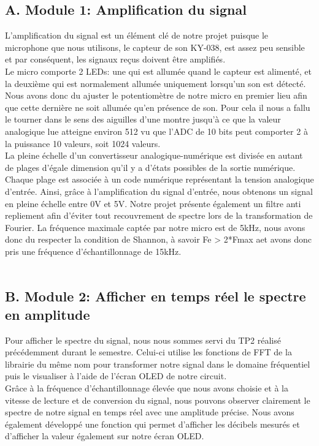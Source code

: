 \documentclass[a4paper,11pt]{book}
\begin{document}
\subsection*{A. Module 1: Amplification du signal }
L'amplification du signal est un élément clé de notre projet puisque le microphone que nous utilisons, le capteur de son KY-038, est assez peu sensible et par conséquent, les signaux reçus doivent être amplifiés.\\ 
Le micro comporte 2 LEDs: une qui est allumée quand le capteur est alimenté, et la deuxième qui est normalement allumée uniquement lorsqu'un son est détecté. 
Nous avons donc du ajuster le potentiomètre de notre micro en premier lieu afin que cette dernière ne soit allumée qu'en présence de son. Pour cela il nous a fallu le tourner dans le sens des aiguilles d'une montre jusqu'à ce que la valeur analogique lue atteigne environ 512 vu que l'ADC de 10 bits peut comporter 2 à la puissance 10 valeurs, soit 1024 valeurs. \\  
La pleine échelle d'un convertisseur analogique-numérique est divisée en autant de plages d’égale dimension qu’il y a d’états possibles de la sortie numérique. Chaque plage est associée à un code numérique représentant la tension analogique d’entrée. Ainsi, grâce à l'amplification du signal d'entrée, nous obtenons un signal en pleine échelle entre 0V et 5V. Notre projet présente également un filtre anti repliement afin d'éviter tout recouvrement de spectre lors de la transformation de Fourier. La fréquence maximale captée par notre micro est de 5kHz, nous avons donc du respecter la condition de Shannon, à savoir Fe > 2*Fmax aet avons donc pris une fréquence d'échantillonnage de 15kHz. \\ \\

\subsection*{B. Module 2: Afficher en temps réel le spectre en amplitude}
Pour afficher le spectre du signal, nous nous sommes servi du TP2 réalisé précédemment durant le semestre. Celui-ci utilise les fonctions de FFT de la librairie du même nom pour transformer notre signal dans le domaine fréquentiel puis le visualiser à l'aide de l'écran OLED de notre circuit. \\ 
Grâce à la fréquence d'échantillonnage élevée que nous avons choisie et à la vitesse de lecture et de conversion du signal, nous pouvons observer clairement le spectre de notre signal en temps réel avec une amplitude précise. Nous avons également développé une fonction qui permet d'afficher les décibels mesurés et d'afficher la valeur également sur notre écran OLED. \\ \\
\end{document}
